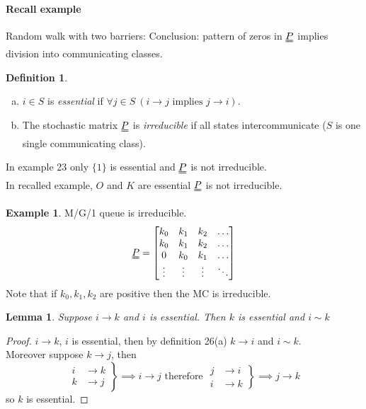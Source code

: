 \documentclass{article}
\newtheorem{lem}[thm]{Lemma}
\theoremstyle{definition}
\newtheorem{defn}[thm]{Definition}
\newtheorem{ex}[thm]{Example}
\begin{document}
\paragraph{Recall example} Random walk with two barriers:
Conclusion: pattern of zeros in $\uuline{P}$ implies division into communicating classes.

\begin{defn}
\begin{enumerate}[(a)]
\item $i\in S$ is \emph{essential} if $\forall j\in S\ (i\rightarrow j \text{ implies } j\rightarrow i)$.
\item The stochastic matrix $\uuline P$ is \emph{irreducible} if all states intercommunicate ($S$ is one single communicating class).
\end{enumerate}
\end{defn}

In example 23 only $\{1\}$ is essential and $\uuline P$ is not irreducible. \\
In recalled example, $O$ and $K$ are essential $\uuline P$ is not irreducible.

\begin{ex}
M/G/1 queue is irreducible.
$$\uuline P = \begin{bmatrix}
k_0 & k_1 & k_2 & \hdots \\
k_0 & k_1 & k_2 & \hdots \\
0 & k_0 & k_1 & \hdots \\
\vdots & \vdots & \vdots & \ddots \\
\end{bmatrix}$$
Note that if $k_0,k_1,k_2$ are positive then the MC is irreducible.
\end{ex}

\begin{lem}
Suppose $i\rightarrow k$ and $i$ is essential.
Then $k$ is essential and $i\sim k$
\end{lem}
\begin{proof}
$i\rightarrow k$, $i$ is essential, then by definition 26(a) $k\rightarrow i$ and $i\sim k$. \\
Moreover suppose $k\rightarrow j$, then 
$$\left.\begin{aligned}i &\rightarrow k \\ k &\rightarrow j\end{aligned}\right\} \implies i\rightarrow j \text{ therefore }\left.\begin{aligned}j &\rightarrow i \\ i &\rightarrow k\end{aligned}\right\} \implies j\rightarrow k$$
so $k$ is essential.
\end{proof}
\end{document}
